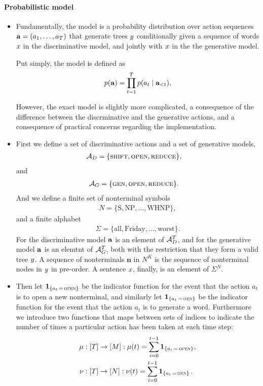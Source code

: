 

\paragraph{Probabilistic model}
\begin{itemize}
  \item Fundamentally, the model is a probability distribution over action sequences $\mathbf{a} = ( a_1, \dots, a_T )$ that generate trees $y$ conditionally given a sequence of words $x$ in the discriminative model, and jointly with $x$ in the the generative model.

  Put simply, the model is defined as
  \begin{equation}
    \label{eq:naive-rnng-model}
    p(\mathbf{a}) = \prod_{t=1}^T p(a_t \mid \mathbf{a}_{<t}),
  \end{equation}

  However, the exact model is slightly more complicated, a consequence of the difference between the discrminative and the generative actions, and a consequence of practical concerns regarding the implementation.

  \item First we define a set of discriminative actions and a set of generative models,
  \begin{align}
    \mathcal{A}_D &= \{ \textsc{shift}, \textsc{open}, \textsc{reduce} \},
  \end{align}
  and
  \begin{align}
    \mathcal{A}_G &= \{ \textsc{gen}, \textsc{open}, \textsc{reduce} \}.
  \end{align}
  And we define a finite set of nonterminal symbols
  \begin{align*}
    N = \{ \text{S}, \text{NP}, \dots, \text{WHNP}\},
  \end{align*}
  and a finite alphabet
  \begin{align*}
    \Sigma = \{ \text{all}, \text{Friday}, \dots, \text{worst} \}.
  \end{align*}
  For the discriminative model $\mathbf{a}$ is an element of $\mathcal{A}_D^T$, and for the generative model $\mathbf{a}$ is an elemtnt of $\mathcal{A}_G^T$, both with the restriction that they form a valid tree $y$. A sequence of nonterminals $\mathbf{n}$ in $N^K$ is the sequence of nonterminal nodes in $y$ in pre-order. A sentence $x$, finally, is an element of $\Sigma^N$.

  \item Then let $\operatorname{\mathbf{1}}_{ \{ a_t \, = \, \textsc{open} \} }$ be the indicator function for the event that the action $a_t$ is to open a new nonterminal, and similarly let $\operatorname{\mathbf{1}}_{ \{ a_t \, = \, \textsc{gen} \} }$ be the indicator function for the event that the action $a_t$ is to generate a word. Furthermore we introduce two functions that maps between sets of indices to indicate the number of times a particular action has been taken at each time step:
  \begin{align*}
    \mu &: [ T ] \to [ M ]: \mu(t) = \sum_{i=0}^{t-1} \operatorname{\mathbf{1}}_{ \{ a_i \, = \, \textsc{open} \} },  \\
    \nu &: [ T ] \to [ N ]: \nu(t) = \sum_{i=0}^{t-1} \operatorname{\mathbf{1}}_{ \{ a_i \, = \, \textsc{gen} \} }.
  \end{align*}


\end{itemize}
